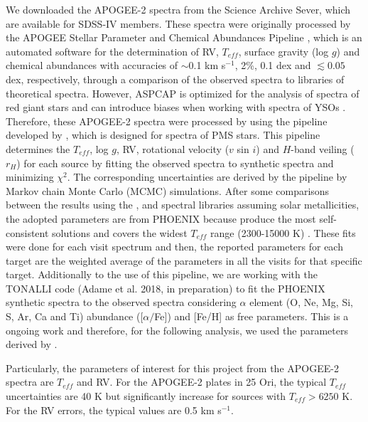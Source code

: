 \documentclass[12pt]{article}
\newcounter{subsubsubsection}[subsubsection]
\begin{document}
\label{sec_APOGEE-2:targets}
We downloaded the APOGEE-2 spectra from the Science Archive Sever, which are available for SDSS-IV members. These spectra were originally processed by the APOGEE Stellar Parameter and Chemical Abundances Pipeline \citep[ASPCAP; ][]{GarciaPerez2016}, which is an automated software for the determination of RV, $T_{eff}$, surface gravity (log $g$) and chemical abundances with accuracies of $\sim$0.1 km s$^{-1}$, 2\%, 0.1 dex and $\lesssim0.05$ dex, respectively, through a comparison of the observed spectra to libraries of theoretical spectra. However, ASPCAP is optimized for the analysis of spectra of red giant stars and can introduce biases when working with spectra of YSOs \citep{Nidever2015}. Therefore, these APOGEE-2 spectra were processed by \citet{Kounkel2018} using the pipeline developed by \citet{Cottaar2014}, which is designed for spectra of PMS stars. This pipeline determines the $T_{eff}$, log $g$, RV, rotational velocity ($v$ sin $i$) and $H$-band veiling ($r_H$) for each source by fitting the observed spectra to synthetic spectra and minimizing $\chi^2$. The corresponding uncertainties are derived by the pipeline by Markov chain Monte Carlo (MCMC) simulations. After some comparisons between the results using the \citet{Coelho2005}, \citet{Allard2012} and \citet[PHOENIX; ][]{Husser2013} spectral libraries assuming solar metallicities, the adopted parameters are from PHOENIX because produce the most self-consistent solutions and covers the widest $T_{eff}$ range (2300-15000 K) \citep{Kounkel2018}. These fits were done for each visit spectrum and then, the reported parameters for each target are the weighted average of the parameters in all the visits for that specific target. Additionally to the use of this pipeline, we are working with the TONALLI code (Adame et al. 2018, in preparation) to fit the PHOENIX synthetic spectra to the observed spectra considering $\alpha$ element (O, Ne, Mg, Si, S, Ar, Ca and Ti) abundance ([$\alpha/$Fe]) and [Fe/H] as free parameters. This is a ongoing work and therefore, for the following analysis, we used the parameters derived by \citet{Kounkel2018}. 

Particularly, the parameters of interest for this project from the APOGEE-2 spectra are $T_{eff}$ and RV. For the APOGEE-2 plates in 25 Ori, the typical $T_{eff}$ uncertainties are 40 K but significantly increase for sources with $T_{eff}>6250$ K. For the RV errors, the typical values are 0.5 km s$^{-1}$.
\end{document}
